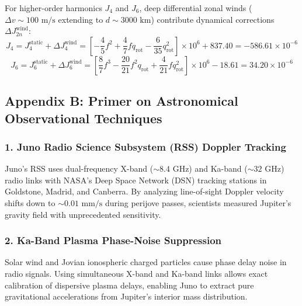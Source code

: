 \documentclass[11pt,a4paper]{article}
\begin{document}
For higher-order harmonics $J_4$ and $J_6$, deep differential zonal winds ($\Delta v \sim 100\text{ m/s}$ extending to $d \sim 3000\text{ km}$) contribute dynamical corrections $\Delta J_{2n}^{\text{wind}}$:
\begin{equation}
J_4 = J_4^{\text{static}} + \Delta J_4^{\text{wind}} = \left[ -\frac{4}{5} f^2 + \frac{4}{7} f q_{\text{rot}} - \frac{6}{35} q_{\text{rot}}^2 \right] \times 10^6 + 837.40 = -586.61 \times 10^{-6}
\end{equation}
\begin{equation}
J_6 = J_6^{\text{static}} + \Delta J_6^{\text{wind}} = \left[ \frac{8}{7} f^3 - \frac{20}{21} f^2 q_{\text{rot}} + \frac{4}{21} f q_{\text{rot}}^2 \right] \times 10^6 - 18.61 = 34.20 \times 10^{-6}
\end{equation}

\subsection*{Appendix B: Primer on Astronomical Observational Techniques}

\subsubsection*{1. Juno Radio Science Subsystem (RSS) Doppler Tracking}
Juno's RSS uses dual-frequency X-band ($\sim 8.4\text{ GHz}$) and Ka-band ($\sim 32\text{ GHz}$) radio links with NASA's Deep Space Network (DSN) tracking stations in Goldstone, Madrid, and Canberra. By analyzing line-of-sight Doppler velocity shifts down to $\sim 0.01\text{ mm/s}$ during perijove passes, scientists measured Jupiter's gravity field with unprecedented sensitivity.

\subsubsection*{2. Ka-Band Plasma Phase-Noise Suppression}
Solar wind and Jovian ionospheric charged particles cause phase delay noise in radio signals. Using simultaneous X-band and Ka-band links allows exact calibration of dispersive plasma delays, enabling Juno to extract pure gravitational accelerations from Jupiter's interior mass distribution.
\end{document}
